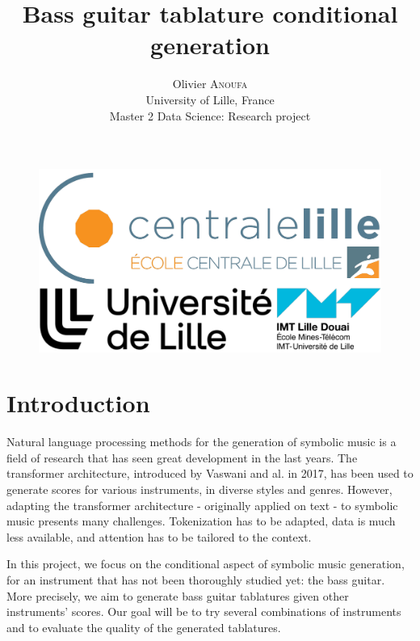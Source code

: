 \documentclass[11pt, a4paper]{article}
\begin{document}
% 

\begin{figure}[t]%
    \centering
    \includegraphics[width=.5\linewidth]{logos_empile}
\end{figure}

\title{Bass guitar tablature conditional generation}

\author{Olivier \textsc{Anoufa} \\  University of Lille, France \\ Master 2 Data Science: Research project}

{\let\newpage\relax\maketitle}

\newpage

\section*{Introduction}

Natural language processing methods for the generation of symbolic music is a field of research that has seen great development in the last years.
The transformer architecture, introduced by Vaswani and al. in 2017, has been used to generate scores for various instruments, in diverse styles and genres\cite{vaswaniAttentionAllYou2023, leNaturalLanguageProcessing2024}.
However, adapting the transformer architecture - originally applied on text - to symbolic music presents many challenges.
Tokenization has to be adapted, data is much less available, and attention has to be tailored to the context\cite{leNaturalLanguageProcessing2024}.

In this project, we focus on the conditional aspect of symbolic music generation, for an instrument that has not been thoroughly studied yet: the bass guitar.
More precisely, we aim to generate bass guitar tablatures given other instruments' scores. Our goal will be to try several combinations of instruments and to evaluate the quality of the generated tablatures.
\end{document}
